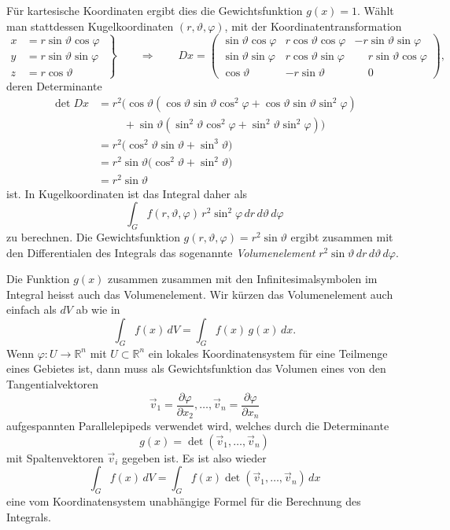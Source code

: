 Für kartesische Koordinaten ergibt dies die Gewichtsfunktion $g(x)=1$.
Wählt man stattdessen Kugelkoordinaten $(r,\vartheta,\varphi)$, mit der
Koordinatentransformation
\begin{equation}
\left.
\begin{aligned}
x&=r\sin\vartheta\cos\varphi\\
y&=r\sin\vartheta\sin\varphi\\
z&=r\cos\vartheta
\end{aligned}
\;\right\}
\qquad
\Rightarrow
\qquad
Dx
=
\begin{pmatrix}
\sin\vartheta\cos\varphi
	&  r \cos\vartheta\cos\varphi
		& -r\sin\vartheta\sin\varphi\\
\sin\vartheta\sin\varphi
	&  r \cos\vartheta\sin\varphi
		& \phantom{-}r\sin\vartheta\cos\varphi\\
\cos\vartheta
	& -r \sin\vartheta
		& \phantom{-}0
\end{pmatrix},
\end{equation}
deren Determinante
\begin{align*}
\det Dx
&=
r^2\bigl(
\cos\vartheta
(\cos\vartheta \sin\vartheta \cos^2\varphi
+
\cos\vartheta \sin\vartheta \sin^2\varphi
)
\\
&\phantom{=}
\quad
+
\sin\vartheta
(
\sin^2\vartheta \cos^2\varphi
+
\sin^2\vartheta \sin^2\varphi
)
\bigr)
\\
&=
r^2\bigl(
\cos^2\vartheta\sin\vartheta
+
\sin^3\vartheta
\bigr)
\\
&=
r^2
\sin\vartheta
\bigl(
\cos^2\vartheta
+
\sin^2\vartheta
\bigr)
\\
&=
r^2\sin\vartheta
\end{align*}
ist.
In Kugelkoordinaten ist das Integral daher als
\[
\int_G f(r,\vartheta,\varphi)
\,
r^2\sin^2\varphi
\,dr\,d\vartheta\,d\varphi
\]
zu berechnen.
Die Gewichtsfunktion $g(r,\vartheta,\varphi)=r^2\sin\vartheta$ ergibt
zusammen mit den Differentialen des Integrals das sogenannte
{\em Volumenelement}
\(
r^2\sin\vartheta\,dr\,d\vartheta\,d\varphi
\).

Die Funktion $g(x)$ zusammen zusammen mit den Infinitesimalsymbolen
im Integral heisst auch das Volumenelement.
%
Wir kürzen das Volumenelement auch einfach als $dV$ ab wie in
\[
\int_G f(x) \,dV
=
\int_G f(x)\,g(x)\,dx.
\]
Wenn $\varphi\colon U\to\mathbb{R}^n$ mit $U\subset\mathbb{R}^n$ ein lokales
Koordinatensystem für eine Teilmenge eines Gebietes ist, dann muss als
Gewichtsfunktion das Volumen eines von den Tangentialvektoren
\[
\vec{v}_1
=
\frac{\partial\varphi}{\partial x_2}
,\dots,
\vec{v}_n
=
\frac{\partial\varphi}{\partial x_n}
\]
aufgespannten Parallelepipeds verwendet wird, welches durch die Determinante
\[
g(x)
=
\det(\vec{v}_1,\dots,\vec{v}_n)
\]
mit Spaltenvektoren $\vec{v}_i$ gegeben ist.
Es ist also wieder
\[
\int_G f(x)\, dV
=
\int_G f(x) \det(\vec{v}_1,\dots,\vec{v}_n)\,dx
\]
eine vom Koordinatensystem unabhängige Formel für die Berechnung des
Integrals.

